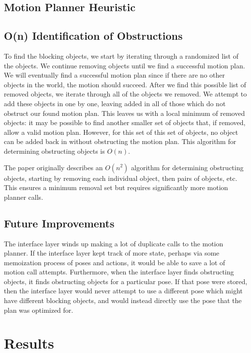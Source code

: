 \documentclass[12pt]{article}
\begin{document}
\subsection{Motion Planner Heuristic}

\subsection{O(n) Identification of Obstructions}

To find the blocking objects, we start by iterating through a randomized list of the objects.  
We continue removing objects until we find a successful motion plan.  
We will eventually find a successful motion plan since if there are no other objects in the world, the motion should succeed.  
After we find this possible list of removed objects, we iterate through all of the objects we removed.  
We attempt to add these objects in one by one, leaving added in all of those which do not obstruct our found motion plan.  
This leaves us with a local minimum of removed objects: it may be possible to find another smaller set of objects that, if removed, allow a valid motion plan.  
However, for this set of this set of objects, no object can be added back in without obstructing the motion plan.
This algorithm for determining obstructing objects is $O(n)$.

The paper originally describes an $O(n^2)$ algorithm for determining obstructing objects, starting by removing each individual object, then pairs of objects, etc.  
This ensures a minimum removal set but requires significantly more motion planner calls.

\subsection{Future Improvements}

The interface layer winds up making a lot of duplicate calls to the motion planner.
If the interface layer kept track of more state, perhaps via some memoization process of poses and actions, it would be able to save a lot of motion call attempts.
Furthermore, when the interface layer finds obstructing objects, it finds obstructing objects for a particular pose.  
If that pose were stored, then the interface layer would never attempt to use a different pose which might have different blocking objects, and would instead directly use the pose that the plan was optimized for.


\section{Results}
\end{document}
